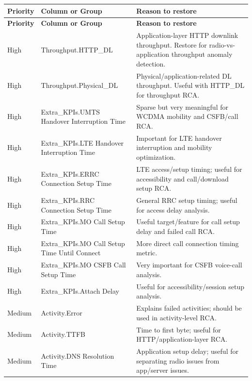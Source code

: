 \documentclass[12pt,a4paper]{article}
\begin{document}
\begin{longtable}{P{2.2cm}P{5.2cm}P{7.1cm}}
\toprule
\textbf{Priority} & \textbf{Column or Group} & \textbf{Reason to restore} \\
\midrule
\endfirsthead
\toprule
\textbf{Priority} & \textbf{Column or Group} & \textbf{Reason to restore} \\
\midrule
\endhead
High & {\ttfamily Throughput.\allowbreak{}HTTP\_\allowbreak{}DL} & Application-layer HTTP downlink throughput. Restore for radio-vs-application throughput anomaly detection. \\
High & {\ttfamily Throughput.\allowbreak{}Physical\_\allowbreak{}DL} & Physical/application-related DL throughput. Useful with HTTP\_DL for throughput RCA. \\
High & {\ttfamily Extra\_\allowbreak{}KPIs.\allowbreak{}UMTS Handover Interruption Time} & Sparse but very meaningful for WCDMA mobility and CSFB/call RCA. \\
High & {\ttfamily Extra\_\allowbreak{}KPIs.\allowbreak{}LTE Handover Interruption Time} & Important for LTE handover interruption and mobility optimization. \\
High & {\ttfamily Extra\_\allowbreak{}KPIs.\allowbreak{}ERRC Connection Setup Time} & LTE access/setup timing; useful for accessibility and call/download setup RCA. \\
High & {\ttfamily Extra\_\allowbreak{}KPIs.\allowbreak{}RRC Connection Setup Time} & General RRC setup timing; useful for access delay analysis. \\
High & {\ttfamily Extra\_\allowbreak{}KPIs.\allowbreak{}MO Call Setup Time} & Useful target/feature for call setup delay and failed call RCA. \\
High & {\ttfamily Extra\_\allowbreak{}KPIs.\allowbreak{}MO Call Setup Time Until Connect} & More direct call connection timing metric. \\
High & {\ttfamily Extra\_\allowbreak{}KPIs.\allowbreak{}MO CSFB Call Setup Time} & Very important for CSFB voice-call analysis. \\
High & {\ttfamily Extra\_\allowbreak{}KPIs.\allowbreak{}Attach Delay} & Useful for accessibility/session setup analysis. \\
Medium & {\ttfamily Activity.\allowbreak{}Error} & Explains failed activities; should be used in activity-level RCA. \\
Medium & {\ttfamily Activity.\allowbreak{}TTFB} & Time to first byte; useful for HTTP/application-layer RCA. \\
Medium & {\ttfamily Activity.\allowbreak{}DNS Resolution Time} & Application setup delay; useful for separating radio issues from app/server issues. \\

\end{longtable}
\end{document}
